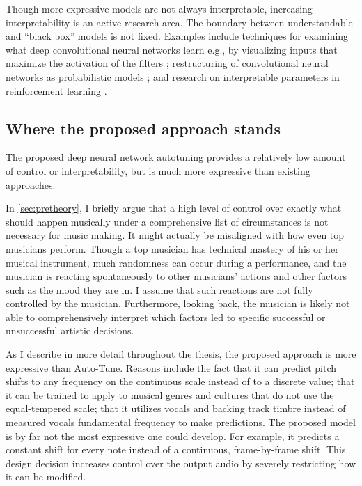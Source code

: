 Though more expressive models are not always interpretable, increasing interpretability is an active research area. The boundary between understandable and ``black box'' models is not fixed. Examples include techniques for examining what deep convolutional neural networks learn e.g., by visualizing inputs that maximize the activation of the filters \cite{qin2018convolutional}; restructuring of convolutional neural networks as probabilistic models \cite{patel2016probabilistic}; and research on interpretable parameters in reinforcement learning \cite{verma2018programmatically}. 

\subsection{Where the proposed approach stands}
The proposed deep neural network autotuning provides a relatively low amount of control or interpretability, but is much more expressive than existing approaches. 

In \ref{sec:pretheory}, I briefly argue that a high level of control over exactly what should happen musically under a comprehensive list of circumstances is not necessary for music making. It might actually be misaligned with how even top musicians perform. Though a top musician has technical mastery of his or her musical instrument, much randomness can occur during a performance, and the musician is reacting spontaneously to other musicians' actions and other factors such as the mood they are in. I assume that such reactions are not fully controlled by the musician. Furthermore, looking back, the musician is likely not able to comprehensively interpret which factors led to specific successful or unsuccessful artistic decisions. 

As I describe in more detail throughout the thesis, the proposed approach is more expressive than Auto-Tune. Reasons include the fact that it can predict pitch shifts to any frequency on the continuous scale instead of to a discrete value; that it can be trained to apply to musical genres and cultures that do not use the equal-tempered scale; that it utilizes vocals and backing track timbre instead of measured vocals fundamental frequency to make predictions. The proposed model is by far not the most expressive one could develop. For example, it predicts a constant shift for every note instead of a continuous, frame-by-frame shift. This design decision increases control over the output audio by severely restricting how it can be modified. 

